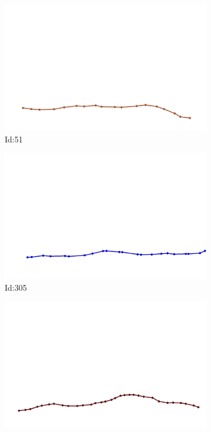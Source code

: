 \documentclass[12pt,twoside]{report}
\begin{document}
\begin{figure}
\centering
\begin{subfigure}[b]{0.20\textwidth}
\centering
\includegraphics[width=\textwidth]{../../trajectories/51.png}
\caption{Id:51}
\end{subfigure}
\begin{subfigure}[b]{0.20\textwidth}
\centering
\includegraphics[width=\textwidth]{../../trajectories/305.png}
\caption{Id:305}
\end{subfigure}
\begin{subfigure}[b]{0.20\textwidth}
\centering
\includegraphics[width=\textwidth]{../../trajectories/813.png}

\end{subfigure}
\end{figure}
\end{document}
